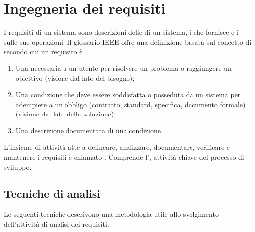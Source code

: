 \section{Ingegneria dei requisiti}

I requisiti di un sistema sono descrizioni delle  di un
sistema, i  che fornisce e i  sulle sue
operazioni. Il glossario IEEE offre una definizione basata sul concetto di
 secondo cui un requisito è

\begin{enumerate}
  \item Una  necessaria a un utente
    per risolvere un problema o raggiungere un obiettivo (visione dal lato del
    bisogno);
  \item Una condizione che deve essere soddisfatta o posseduta da un sistema per
    adempiere a un obbligo (contratto, standard, specifica, documento formale)
    (visione dal lato della soluzione);
  \item Una descrizione documentata di una condizione.
\end{enumerate}


L'insieme di attività atte a delineare, analizzare, documentare,
verificare e mantenere i requisiti è chiamato .
Comprende l', attività chiave del processo di
sviluppo.

\subsection{Tecniche di analisi}
\label{sub:tecniche_di_analisi}

Le seguenti tecniche descrivono una metodologia utile allo svolgimento
dell'attività di analisi dei requisiti.


